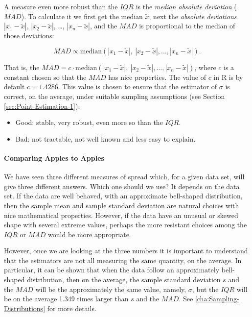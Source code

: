 \documentclass[captions=tableheading]{scrbook}
\begin{document}
A measure even more robust than the \(IQR\) is the \emph{median absolute deviation} (\(MAD\)). To calculate it we first get the median \(\widetilde{x}\), next the \emph{absolute deviations} \(|x_{1}-\tilde{x}|\), \(|x_{2}-\tilde{x}|\), \ldots{}, \(|x_{n}-\tilde{x}|\), and the \(MAD\) is proportional to the median of those deviations:

\begin{equation}
MAD\propto\mbox{median}(|x_{1}-\tilde{x}|,\ |x_{2}-\tilde{x}|,\ldots,|x_{n}-\tilde{x}|).
\end{equation}

That is, the \(MAD=c\cdot\mbox{median}(|x_{1}-\tilde{x}|,\ |x_{2}-\tilde{x}|,\ldots,|x_{n}-\tilde{x}|)\), where \(c\) is a constant chosen so that the \(MAD\) has nice properties. The value of \(c\) in \textsf{R} is by default \(c=1.4286\). This value is chosen to ensure that the estimator of \(\sigma\) is correct, on the average, under suitable sampling assumptions (see Section \ref{sec:Point-Estimation-1}).

\begin{itemize}
\item Good: stable, very robust, even more so than the \(IQR\).
\item Bad: not tractable, not well known and less easy to explain.
\end{itemize}


\paragraph*{Comparing Apples to Apples}

We have seen three different measures of spread which, for a given data set, will give three different answers. Which one should we use? It depends on the data set. If the data are well behaved, with an approximate bell-shaped distribution, then the sample mean and sample standard deviation are natural choices with nice mathematical properties. However, if the data have an unusual or skewed shape with several extreme values, perhaps the more resistant choices among the \(IQR\) or \(MAD\) would be more appropriate.

However, once we are looking at the three numbers it is important to understand that the estimators are not all measuring the same quantity, on the average. In particular, it can be shown that when the data follow an approximately bell-shaped distribution, then on the average, the sample standard deviation \(s\) and the \(MAD\) will be the approximately the same value, namely, \(\sigma\), but the \(IQR\) will be on the average 1.349 times larger than \(s\) and the \(MAD\). See \ref{cha:Sampling-Distributions} for more details.
\end{document}
